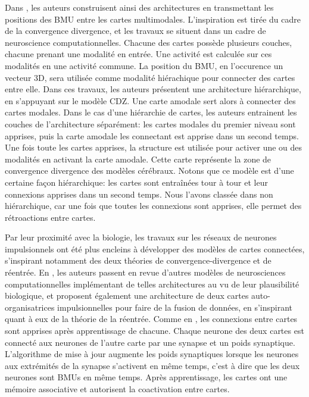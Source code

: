 \documentclass[../main]{subfiles}
\begin{document}
Dans \cite{dominey13}, les auteurs construisent ainsi des architectures en transmettant les positions des BMU entre les cartes multimodales. L'inspiration est tirée du cadre de la convergence divergence, et les travaux se situent dans un cadre de neuroscience computationnelles.
Chacune des cartes possède plusieurs couches, chacune prenant une modalité en entrée. Une activité est calculée sur ces modalités en une activité commune. La position du BMU, en l'occurence un vecteur 3D, sera utilisée comme modalité hiérachique pour connecter des cartes entre elle. Dans ces travaux, les auteurs présentent une architecture hiérarchique, en s'appuyant sur le modèle CDZ. Une carte amodale sert alors à connecter des cartes modales.
Dans le cas d'une hiérarchie de cartes, les auteurs entrainent les couches de l'architecture séparément: les cartes modales du premier niveau sont apprises, puis la carte amodale les connectant est apprise dans un second temps. 
Une fois toute les cartes apprises, la structure est utilisée pour activer une ou des modalités en activant la carte amodale. Cette carte représente la zone de convergence divergence des modèles cérébraux. 
Notons que ce modèle est d'une certaine façon hiérarchique: les cartes sont entraînées tour à tour et leur connexions apprises dans un second temps. Nous l'avons classée dans non hiérarchique, car une fois que toutes les connexions sont apprises, elle permet des rétroactions entre cartes.

Par leur proximité avec la biologie, les travaux sur les réseaux de neurones impulsionnels ont été plus encleins à développer des modèles de cartes connectées, s'inspirant notamment des deux théories de convergence-divergence et de réentrée.
En \cite{khacef_brain-inspired_2020}, les auteurs passent en revue d'autres modèles de neurosciences computationnelles implémentant de telles architectures au vu de leur plausibilité biologique, et proposent également une architecture de deux cartes auto-organisatrices impulsionnelles pour faire de la fusion de données, en s'inspirant quant à eux de la théorie de la réentrée.
Comme en \cite{dominey13}, les connexions entre cartes sont apprises après apprentissage de chacune. Chaque neurone des deux cartes est connecté aux neurones de l'autre carte par une synapse et un poids synaptique. L'algorithme de mise à jour augmente les poids synaptiques lorsque les neurones aux extrémités de la synapse s'activent en même temps, c'est à dire que les deux neurones sont BMUs en même temps. Après apprentissage, les cartes ont une mémoire associative et autorisent la coactivation entre cartes.
\end{document}
